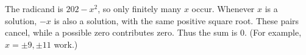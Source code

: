 The radicand is $202-x^2$, so only finitely many $x$ occur. Whenever $x$ is a solution, $-x$ is also a solution, with the same positive square root. These pairs cancel, while a possible zero contributes zero. Thus the sum is $\boxed0$. (For example, $x=\pm9,\pm11$ work.)
